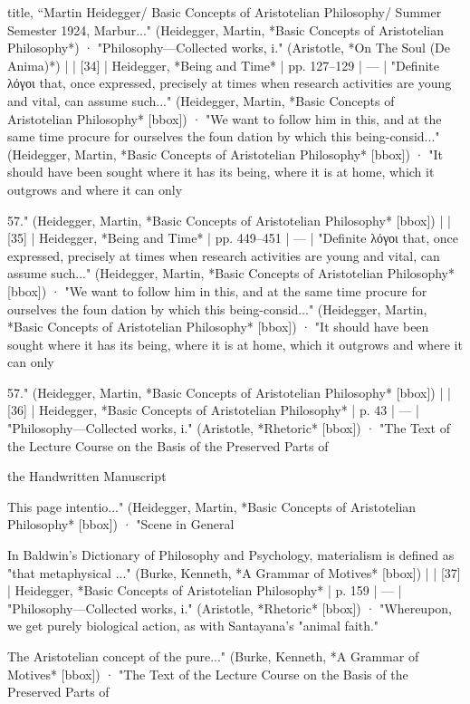 title, “Martin Heidegger/ Basic Concepts of Aristotelian Philosophy/ Summer Semester 1924, Marbur..." (Heidegger, Martin, *Basic Concepts of Aristotelian Philosophy*) · "Philosophy—Collected works, i." (Aristotle, *On The Soul (De Anima)*) |
| [34] | Heidegger, *Being and Time* | pp. 127–129 | — | "Definite λόγοι that, once expressed, precisely at times when research activities are young and vital, can assume such..." (Heidegger, Martin, *Basic Concepts of Aristotelian Philosophy* [bbox]) · "We want to follow him in this, and at the same time procure for ourselves the foun­ dation by which this being-consid..." (Heidegger, Martin, *Basic Concepts of Aristotelian Philosophy* [bbox]) · "It should have been sought where it has its being, where it is at home, which it outgrows and where it can only

57." (Heidegger, Martin, *Basic Concepts of Aristotelian Philosophy* [bbox]) |
| [35] | Heidegger, *Being and Time* | pp. 449–451 | — | "Definite λόγοι that, once expressed, precisely at times when research activities are young and vital, can assume such..." (Heidegger, Martin, *Basic Concepts of Aristotelian Philosophy* [bbox]) · "We want to follow him in this, and at the same time procure for ourselves the foun­ dation by which this being-consid..." (Heidegger, Martin, *Basic Concepts of Aristotelian Philosophy* [bbox]) · "It should have been sought where it has its being, where it is at home, which it outgrows and where it can only

57." (Heidegger, Martin, *Basic Concepts of Aristotelian Philosophy* [bbox]) |
| [36] | Heidegger, *Basic Concepts of Aristotelian Philosophy* | p. 43 | — | "Philosophy—Collected works, i." (Aristotle, *Rhetoric* [bbox]) · "The Text of the Lecture Course on the Basis of the Preserved Parts of

the Handwritten Manuscript

This page intentio..." (Heidegger, Martin, *Basic Concepts of Aristotelian Philosophy* [bbox]) · "Scene in General

In Baldwin's Dictionary of Philosophy and Psychology, materialism is defined as "that metaphysical ..." (Burke, Kenneth, *A Grammar of Motives* [bbox]) |
| [37] | Heidegger, *Basic Concepts of Aristotelian Philosophy* | p. 159 | — | "Philosophy—Collected works, i." (Aristotle, *Rhetoric* [bbox]) · "Whereupon, we get purely biological action, as with Santayana's "animal faith."

The Aristotelian concept of the pure..." (Burke, Kenneth, *A Grammar of Motives* [bbox]) · "The Text of the Lecture Course on the Basis of the Preserved Parts of

